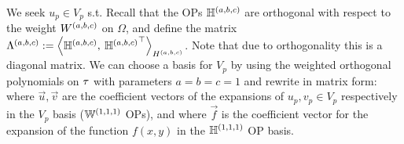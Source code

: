 We seek $u_p \in V_p$ s.t.
Recall that the OPs $\mathbb{H}^{(a,b,c)}$ are orthogonal with respect to the weight ${W^{(a,b,c)}}$ on $\Omega$, and define the matrix $\Lambda^{(a,b,c)} :=  \ip< \bighdop^{(a,b,c)}, \: {\bighdop^{(a,b,c)}}^\top >_{\hdopabc}$. Note that due to orthogonality this is a diagonal matrix. We can choose a basis for $V_p$ by using the weighted orthogonal polynomials on $\tau$ with parameters $a = b = c = 1$
and rewrite  in matrix form:
where $\vec{u}, \vec{v}$ are the coefficient vectors of the expansions of $u_p, v_p \in V_p$ respectively in the $V_p$ basis (${\mathbb{W}^{(1,1,1)}}$ OPs), and
where $\vec{f}$ is the coefficient vector for the expansion of the function $f(x,y)$ in the ${\mathbb{H}^{(1,1,1)}}$ OP basis.

